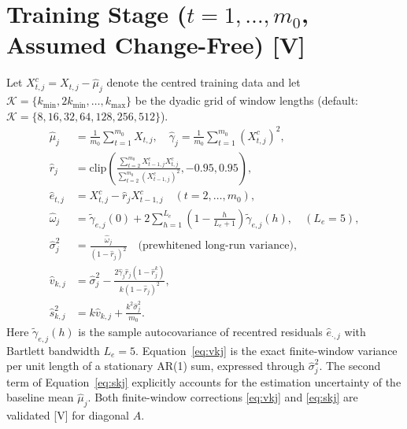 \documentclass[11pt]{article}
\begin{document}
\section{Training Stage ($t = 1, \ldots, m_0$, Assumed Change-Free) [V]}
Let $X^c_{t,j} = X_{t,j} - \hat{\mu}_j$ denote the centred training data and let $\mathcal{K} = \{k_{\min}, 2k_{\min}, \ldots, k_{\max}\}$ be the dyadic grid of window lengths (default: $\mathcal{K} = \{8, 16, 32, 64, 128, 256, 512\}$).
\begin{align}
    \hat{\mu}_j &= \frac{1}{m_0} \sum_{t=1}^{m_0} X_{t,j}, \quad \hat{\gamma}_j = \frac{1}{m_0} \sum_{t=1}^{m_0} (X^c_{t,j})^2, \label{eq:mu_gamma} \\
    \hat{r}_j &= \text{clip}\left( \frac{\sum_{t=2}^{m_0} X^c_{t-1,j} X^c_{t,j}}{\sum_{t=2}^{m_0} (X^c_{t-1,j})^2}, -0.95, 0.95 \right), \label{eq:r_hat} \\
    \hat{e}_{t,j} &= X^c_{t,j} - \hat{r}_j X^c_{t-1,j} \quad (t = 2, \ldots, m_0), \label{eq:innov} \\
    \hat{\omega}_j &= \tilde{\gamma}_{e,j}(0) + 2 \sum_{h=1}^{L_e} \left( 1 - \frac{h}{L_e + 1} \right) \tilde{\gamma}_{e,j}(h), \quad (L_e = 5), \label{eq:omega_hat} \\
    \hat{\sigma}_j^2 &= \frac{\hat{\omega}_j}{(1 - \hat{r}_j)^2} \quad \text{(prewhitened long-run variance)}, \label{eq:lrv} \\
    \hat{v}_{k,j} &= \hat{\sigma}_j^2 - \frac{2 \hat{\gamma}_j \hat{r}_j (1 - \hat{r}_j^k)}{k (1 - \hat{r}_j)^2}, \label{eq:vkj} \\
    \hat{s}^2_{k,j} &= k \hat{v}_{k,j} + \frac{k^2 \hat{\sigma}_j^2}{m_0}. \label{eq:skj}
\end{align}
Here $\tilde{\gamma}_{e,j}(h)$ is the sample autocovariance of recentred residuals $\hat{e}_{\cdot,j}$ with Bartlett bandwidth $L_e = 5$. Equation~\eqref{eq:vkj} is the exact finite-window variance per unit length of a stationary AR(1) sum, expressed through $\hat{\sigma}_j^2$. The second term of Equation~\eqref{eq:skj} explicitly accounts for the estimation uncertainty of the baseline mean $\hat{\mu}_j$. Both finite-window corrections \eqref{eq:vkj} and \eqref{eq:skj} are validated [V] for diagonal $A$.
\end{document}
